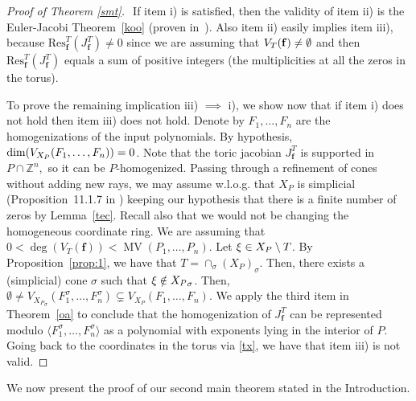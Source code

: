 \documentclass[a4paper,11pt]{amsart}
\newcommand{\MV}{\operatorname{MV}}
\newcommand{\Z}{\mathbb{Z}}
\newcommand{\bff}{{\boldsymbol{f}}}
\numberwithin{thm}{section}
\numberwithin{equation}{section}
\theoremstyle{definition}
\theoremstyle{plain}
\begin{document}
\begin{proof}[Proof of Theorem \ref{smt}] $^{}$
If item i) is satisfied, then the validity of item ii) is the Euler-Jacobi Theorem~\ref{koo} (proven in~\cite[Corollary $5$]{CD97}).
Also item ii) easily implies item iii), because $\mbox{Res}^T_{\bff}(J^T_\bff) \neq 0$ since we are assuming that $V_T({\bf f}) \neq \emptyset$ and then $\mbox{Res}^T_{\bff}(J^T_\bff)$ equals a sum of positive integers (the multiplicities at all the zeros in the torus).

To prove the remaining implication iii) $\implies$ i), we show now that
 if item i) does not hold then item iii) does not hold. Denote by $F_1, \dots, F_n$ are the homogenizations of the input polynomials. By hypothesis, ${\rm dim}(V_{X_P}(F_1, \dots, F_n) )=0$.
 Note that the toric jacobian $J^T_\bff$ is  supported in $P\cap\Z^n,$ so it can be $P$-homogenized. 
Passing through a refinement of cones without adding new rays, we may assume w.l.o.g. that $X_P$ is simplicial (Proposition~11.1.7 in \cite{CLS11}) keeping our hypothesis that
there is a finite number of zeros by Lemma~\ref{tec}. Recall also that we would not be changing the homogeneous coordinate ring. 
We are assuming that
$0 < \deg(V_T(\bff)) <\MV(P_1,\ldots, P_n)$.
 Let ${\bf \xi} \in X_P \setminus T$. By Proposition~\ref{prop:1}, we have that $T = \cap_\sigma (X_P)_\sigma$. Then, there exists a (simplicial) cone $\sigma$ such that ${\bf \xi} \notin {X_P}_\sigma$. Then,
 $\emptyset\neq V_{{X_P}_\sigma}(F_1^\sigma, \ldots, F_n^\sigma)\subsetneq V_{X_P}(F_1,\ldots, F_n)$. 
We apply the third item in Theorem~\ref{oa} to conclude that the homogenization of $J^T_\bff$ can be represented modulo $\langle F_1^\sigma,\ldots, F_n^\sigma\rangle$ 
as a polynomial with exponents lying in the interior of $P$. Going back to the coordinates in the torus via \eqref{tx}, we have that item iii) is not valid.
\end{proof}


We now present the proof of our second main theorem stated in the Introduction.
\end{document}
